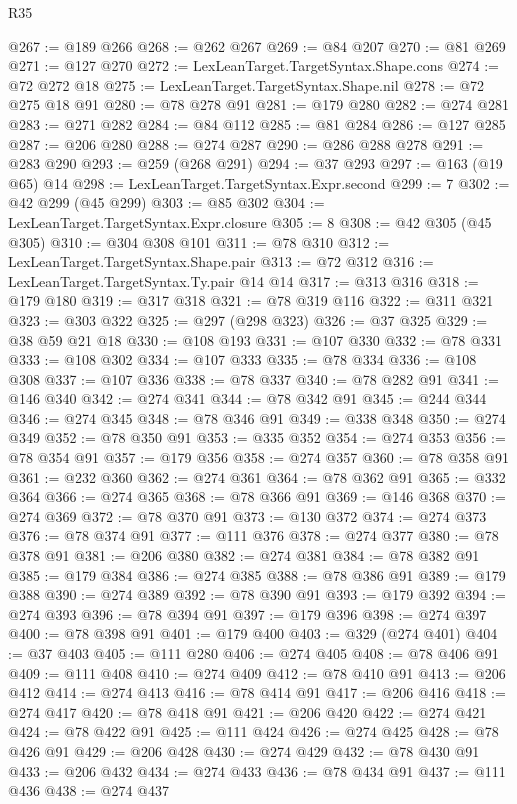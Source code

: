\begin{lexlean}{R35}
\begin{coremodule}
@267 := @189 @266
@268 := @262 @267
@269 := @84 @207
@270 := @81 @269
@271 := @127 @270
@272 := LexLeanTarget.TargetSyntax.Shape.cons
@274 := @72 @272 @18
@275 := LexLeanTarget.TargetSyntax.Shape.nil
@278 := @72 @275 @18 @91
@280 := @78 @278 @91
@281 := @179 @280
@282 := @274 @281
@283 := @271 @282
@284 := @84 @112
@285 := @81 @284
@286 := @127 @285
@287 := @206 @280
@288 := @274 @287
@290 := @286 @288 @278
@291 := @283 @290
@293 := @259 (@268 @291)
@294 := @37 @293
@297 := @163 (@19 @65) @14
@298 := LexLeanTarget.TargetSyntax.Expr.second
@299 := 7
@302 := @42 @299 (@45 @299)
@303 := @85 @302
@304 := LexLeanTarget.TargetSyntax.Expr.closure
@305 := 8
@308 := @42 @305 (@45 @305)
@310 := @304 @308 @101
@311 := @78 @310
@312 := LexLeanTarget.TargetSyntax.Shape.pair
@313 := @72 @312
@316 := LexLeanTarget.TargetSyntax.Ty.pair @14 @14
@317 := @313 @316
@318 := @179 @180
@319 := @317 @318
@321 := @78 @319 @116
@322 := @311 @321
@323 := @303 @322
@325 := @297 (@298 @323)
@326 := @37 @325
@329 := @38 @59 @21 @18
@330 := @108 @193
@331 := @107 @330
@332 := @78 @331
@333 := @108 @302
@334 := @107 @333
@335 := @78 @334
@336 := @108 @308
@337 := @107 @336
@338 := @78 @337
@340 := @78 @282 @91
@341 := @146 @340
@342 := @274 @341
@344 := @78 @342 @91
@345 := @244 @344
@346 := @274 @345
@348 := @78 @346 @91
@349 := @338 @348
@350 := @274 @349
@352 := @78 @350 @91
@353 := @335 @352
@354 := @274 @353
@356 := @78 @354 @91
@357 := @179 @356
@358 := @274 @357
@360 := @78 @358 @91
@361 := @232 @360
@362 := @274 @361
@364 := @78 @362 @91
@365 := @332 @364
@366 := @274 @365
@368 := @78 @366 @91
@369 := @146 @368
@370 := @274 @369
@372 := @78 @370 @91
@373 := @130 @372
@374 := @274 @373
@376 := @78 @374 @91
@377 := @111 @376
@378 := @274 @377
@380 := @78 @378 @91
@381 := @206 @380
@382 := @274 @381
@384 := @78 @382 @91
@385 := @179 @384
@386 := @274 @385
@388 := @78 @386 @91
@389 := @179 @388
@390 := @274 @389
@392 := @78 @390 @91
@393 := @179 @392
@394 := @274 @393
@396 := @78 @394 @91
@397 := @179 @396
@398 := @274 @397
@400 := @78 @398 @91
@401 := @179 @400
@403 := @329 (@274 @401)
@404 := @37 @403
@405 := @111 @280
@406 := @274 @405
@408 := @78 @406 @91
@409 := @111 @408
@410 := @274 @409
@412 := @78 @410 @91
@413 := @206 @412
@414 := @274 @413
@416 := @78 @414 @91
@417 := @206 @416
@418 := @274 @417
@420 := @78 @418 @91
@421 := @206 @420
@422 := @274 @421
@424 := @78 @422 @91
@425 := @111 @424
@426 := @274 @425
@428 := @78 @426 @91
@429 := @206 @428
@430 := @274 @429
@432 := @78 @430 @91
@433 := @206 @432
@434 := @274 @433
@436 := @78 @434 @91
@437 := @111 @436
@438 := @274 @437

\end{coremodule}
\end{lexlean}
